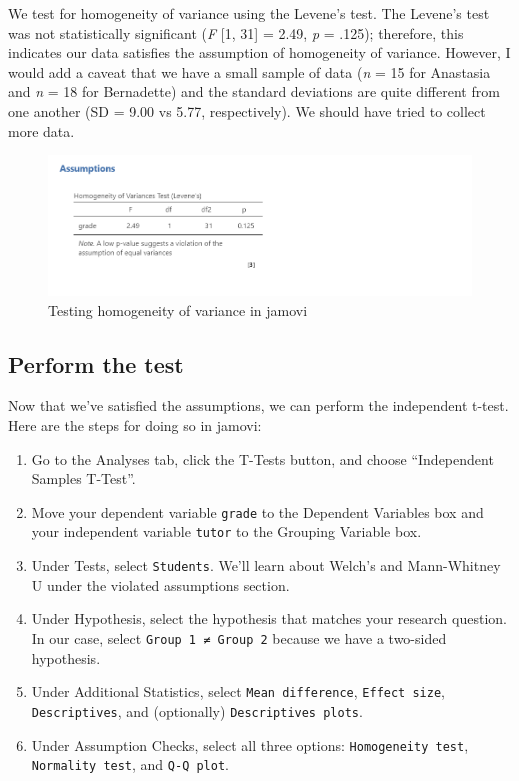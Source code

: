 \documentclass[
]{book}
\begin{document}
We test for homogeneity of variance using the Levene's test. The Levene's test was not statistically significant (\emph{F} {[}1, 31{]} = 2.49, \emph{p} = .125); therefore, this indicates our data satisfies the assumption of homogeneity of variance. However, I would add a caveat that we have a small sample of data (\emph{n} = 15 for Anastasia and \emph{n} = 18 for Bernadette) and the standard deviations are quite different from one another (SD = 9.00 vs 5.77, respectively). We should have tried to collect more data.

\begin{figure}

{\centering \includegraphics[width=1\linewidth]{images/02-independent_t-test/independent_t-test_homogeneity} 

}

\caption{Testing homogeneity of variance in jamovi}\label{fig:unnamed-chunk-6}
\end{figure}

\hypertarget{perform-the-test-1}{%
\subsection{Perform the test}\label{perform-the-test-1}}

Now that we've satisfied the assumptions, we can perform the independent t-test. Here are the steps for doing so in jamovi:

\begin{enumerate}
\def\labelenumi{\arabic{enumi}.}
\item
  Go to the Analyses tab, click the T-Tests button, and choose ``Independent Samples T-Test''.
\item
  Move your dependent variable \texttt{grade} to the Dependent Variables box and your independent variable \texttt{tutor} to the Grouping Variable box.
\item
  Under Tests, select \texttt{Student\textquotesingle{}s}. We'll learn about Welch's and Mann-Whitney U under the violated assumptions section.
\item
  Under Hypothesis, select the hypothesis that matches your research question. In our case, select \texttt{Group\ 1\ ≠\ Group\ 2} because we have a two-sided hypothesis.
\item
  Under Additional Statistics, select \texttt{Mean\ difference}, \texttt{Effect\ size}, \texttt{Descriptives}, and (optionally) \texttt{Descriptives\ plots}.
\item
  Under Assumption Checks, select all three options: \texttt{Homogeneity\ test}, \texttt{Normality\ test}, and \texttt{Q-Q\ plot}.
\end{enumerate}
\end{document}
